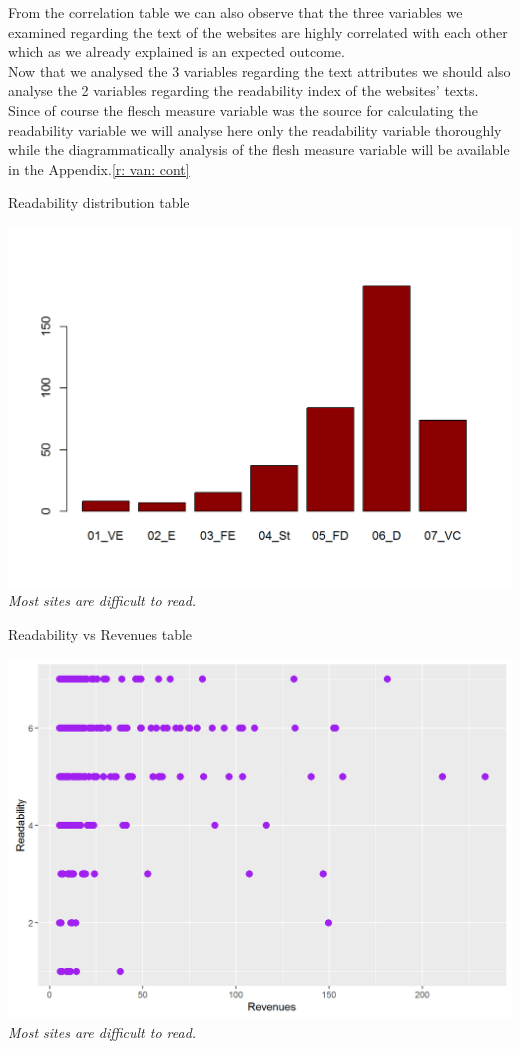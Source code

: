 \documentclass{book}
\begin{document}
From the correlation table we can also observe that the three variables we examined regarding the text of the websites are highly correlated with each other which as we already explained is an expected outcome. \\
Now that we analysed the 3 variables regarding the text attributes we should also analyse the 2 variables regarding the readability index of the websites' texts. Since of course the flesch measure variable was the source for calculating the readability variable we will analyse here only the readability variable thoroughly while the diagrammatically analysis of the flesh measure variable will be available in the Appendix.\ref{r: van: cont}
\begin{table}[H]
\centering
\caption{Readability distribution table}
\begin{center}
\includegraphics[scale=0.5]{../R/photos/41_read_dist.png}    \\
\textit{Most sites are difficult to read.}
\end{center}
\end{table}
\begin{table}[H]
\centering
\caption{Readability vs Revenues table}
\begin{center}
\includegraphics[scale=0.5]{../R/photos/42_read_rev.png}   \\
\textit{Most sites are difficult to read.}
\end{center}
\end{table}
\end{document}
